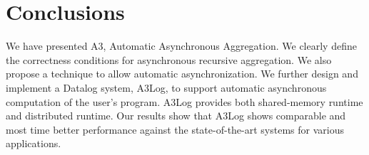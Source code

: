 \section{Conclusions}
\label{sec:conclusion}
We have presented A3, Automatic Asynchronous Aggregation. We clearly define the correctness conditions for asynchronous recursive aggregation.  We also propose a technique to allow automatic asynchronization. We further design and implement a Datalog system, A3Log, to support automatic asynchronous computation of the user's program. A3Log provides both shared-memory runtime and distributed runtime. Our results show that A3Log shows comparable and most time better performance against the state-of-the-art systems for various applications.

